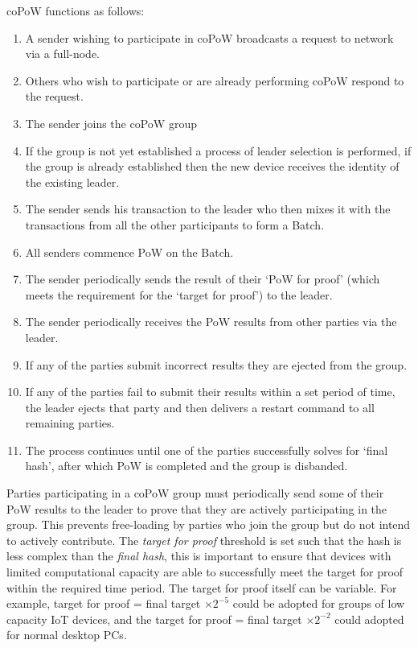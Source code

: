 \documentclass[a4paper,10pt,twocolumn]{article}
\begin{document}
coPoW functions as follows:

\vspace{-0.5\baselineskip}
\begin{enumerate}
	\setlength\itemsep{0em}
	\item A sender wishing to participate in coPoW broadcasts a request to network via a full-node.
	\item Others who wish to participate or are already performing coPoW respond to the request.
	\item The sender joins the coPoW group
	\item If the group is not yet established a process of leader selection is performed, if the group is already established then 
	the new device receives the identity of the existing leader.
	\item The sender sends his transaction to the leader who then mixes it with the transactions from all the other participants to 
	form a Batch.
	\item All senders commence PoW on the Batch.
	\item The sender periodically sends the result of their `PoW for proof' (which meets the requirement for the `target for proof') to the leader.
	\item The sender periodically receives the PoW results from other parties via the leader. 
	\item If any of the parties submit incorrect results they are ejected from the group.
	\item If any of the parties fail to submit their results within a set period of time, the leader ejects that party and then 
	delivers a restart command to all remaining parties.
	\item The process continues until one of the parties successfully solves for `final hash', after which PoW is completed and 
	the group is disbanded.
\end{enumerate}

Parties participating in a coPoW group must periodically send some of their PoW results to the leader to prove 
that they are actively participating in the group. This prevents free-loading by parties who join the group but do not intend to 
actively contribute. The \emph{target for proof} threshold is set such that the hash is less complex than the \emph{final hash},
this is important to ensure that devices with limited computational capacity are able to successfully meet the 
target for proof within the required time period. The target for proof itself can be variable. For example, target for proof = final 
target \(  \times 2^{-5} \) could be adopted for groups of low capacity IoT devices, and the target for proof = final target  \( \times 
2^{-2} \) could adopted for normal desktop PCs.
\end{document}
